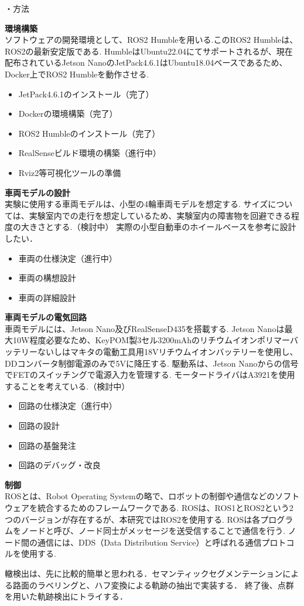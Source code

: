 \documentclass[a4paper]{jarticle}
\begin{document}
・方法{
\textbf{環境構築\\}
ソフトウェアの開発環境として、ROS2 Humbleを用いる.このROS2 Humbleは、ROS2の最新安定版である.
HumbleはUbuntu22.04にてサポートされるが、現在配布されているJetson NanoのJetPack4.6.1はUbuntu18.04ベースであるため、Docker上でROS2 Humbleを動作させる.

\begin{itemize}
	\item JetPack4.6.1のインストール（完了）
	\item Dockerの環境構築（完了）
	\item ROS2 Humbleのインストール（完了）
	\item RealSenseビルド環境の構築（進行中）
	\item Rviz2等可視化ツールの準備
\end{itemize}

\textbf{車両モデルの設計\\}
実験に使用する車両モデルは、小型の4輪車両モデルを想定する.
サイズについては、実験室内での走行を想定しているため、実験室内の障害物を回避できる程度の大きさとする.（検討中）
実際の小型自動車のホイールベースを参考に設計したい．

\begin{itemize}
	\item 車両の仕様決定（進行中）
	\item 車両の構想設計
	\item 車両の詳細設計
\end{itemize}

\textbf{車両モデルの電気回路\\}
車両モデルには、Jetson Nano及びRealSenseD435を搭載する.
Jetson Nanoは最大10W程度必要なため、KeyPOM製3セル3200mAhのリチウムイオンポリマーバッテリーないしはマキタの電動工具用18Vリチウムイオンバッテリーを使用し、
DDコンバータ制御電源のみで5Vに降圧する.
駆動系は、Jetson Nanoからの信号でFETのスイッチングで電源入力を管理する.
モータードライバはA3921を使用することを考えている.（検討中）

\begin{itemize}
	\item 回路の仕様決定（進行中）
	\item 回路の設計
	\item 回路の基盤発注
	\item 回路のデバッグ・改良
\end{itemize}



\textbf{制御\\}
ROSとは、Robot Operating Systemの略で、ロボットの制御や通信などのソフトウェアを統合するためのフレームワークである.
ROSは、ROS1とROS2という2つのバージョンが存在するが、本研究ではROS2を使用する.
ROSは各プログラムをノードと呼び、ノード同士がメッセージを送受信することで通信を行う.
ノード間の通信には、DDS（Data Distribution Service）と呼ばれる通信プロトコルを使用する.

轍検出は、先に比較的簡単と思われる．セマンティックセグメンテーションによる路面のラベリングと、ハフ変換による軌跡の抽出で実装する．
終了後、点群を用いた軌跡検出にトライする．
}
\end{document}
